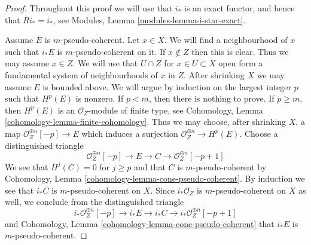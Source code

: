\begin{proof}
Throughout this proof we will use that $i_*$ is an exact functor, and
hence that $Ri_* = i_*$, see Modules, Lemma \ref{modules-lemma-i-star-exact}.

\medskip\noindent
Assume $E$ is $m$-pseudo-coherent. Let $x \in X$. We will find a neighbourhood
of $x$ such that $i_*E$ is $m$-pseudo-coherent on it. If $x \not \in Z$
then this is clear. Thus we may assume $x \in Z$. We will use
that $U \cap Z$ for $x \in U \subset X$ open form a fundamental system of
neighbourhoods of $x$ in $Z$. After shrinking $X$ we may assume $E$ is
bounded above. We will argue by induction on
the largest integer $p$ such that $H^p(E)$ is nonzero. If $p < m$, then
there is nothing to prove. If $p \geq m$, then $H^p(E)$ is an
$\mathcal{O}_Z$-module of finite type, see
Cohomology, Lemma \ref{cohomology-lemma-finite-cohomology}.
Thus we may choose, after shrinking $X$, a map
$\mathcal{O}_Z^{\oplus n}[-p] \to E$ which induces a surjection
$\mathcal{O}_Z^{\oplus n} \to H^p(E)$. Choose a distinguished triangle
$$
\mathcal{O}_Z^{\oplus n}[-p] \to E \to C \to \mathcal{O}_Z^{\oplus n}[-p + 1]
$$
We see that $H^j(C) = 0$ for $j \geq p$ and that $C$ is $m$-pseudo-coherent
by Cohomology, Lemma \ref{cohomology-lemma-cone-pseudo-coherent}.
By induction we see that $i_*C$ is $m$-pseudo-coherent on $X$.
Since $i_*\mathcal{O}_Z$ is $m$-pseudo-coherent on $X$ as well, we conclude
from the distinguished triangle
$$
i_*\mathcal{O}_Z^{\oplus n}[-p] \to i_*E \to i_*C \to
i_*\mathcal{O}_Z^{\oplus n}[-p + 1]
$$
and
Cohomology, Lemma \ref{cohomology-lemma-cone-pseudo-coherent}
that $i_*E$ is $m$-pseudo-coherent.


\end{proof}
